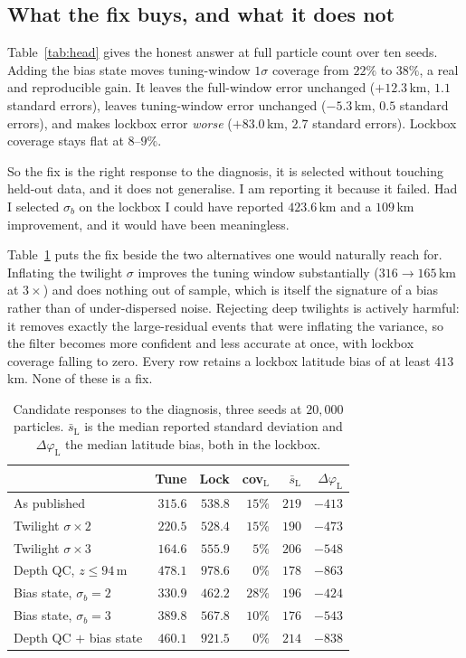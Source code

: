\documentclass[conference]{IEEEtran}
\begin{document}
\subsection{What the fix buys, and what it does not}
Table~\ref{tab:head} gives the honest answer at full particle count over ten
seeds. Adding the bias state moves tuning-window $1\sigma$ coverage from $22\%$
to $38\%$, a real and reproducible gain. It leaves the full-window error
unchanged ($+12.3$\,\si{\km}, $1.1$ standard errors), leaves tuning-window error
unchanged ($-5.3$\,\si{\km}, $0.5$ standard errors), and makes lockbox error
\emph{worse} ($+83.0$\,\si{\km}, $2.7$ standard errors). Lockbox coverage stays
flat at $8$--$9\%$.

So the fix is the right response to the diagnosis, it is selected without
touching held-out data, and it does not generalise. I am reporting it because it
failed. Had I selected $\sigma_b$ on the lockbox I could have reported
$423.6$\,\si{\km} and a $109$\,\si{\km} improvement, and it would have been
meaningless.

Table~\ref{tab:ladder} puts the fix beside the two alternatives one would
naturally reach for. Inflating the twilight $\sigma$ improves the tuning window
substantially ($316 \rightarrow 165$\,\si{\km} at $3\times$) and does nothing out
of sample, which is itself the signature of a bias rather than of
under-dispersed noise. Rejecting deep twilights is actively harmful: it removes
exactly the large-residual events that were inflating the variance, so the
filter becomes more confident and less accurate at once, with lockbox coverage
falling to zero. Every row retains a lockbox latitude bias of at least
$413$\,\si{\km}. None of these is a fix.

\begin{table}[t]
\caption{Candidate responses to the diagnosis, three seeds at $20{,}000$
particles. $\bar{s}_\text{L}$ is the median reported standard deviation and
$\Delta\varphi_\text{L}$ the median latitude bias, both in the lockbox.}
\label{tab:ladder}
\centering
\begin{tabular}{lrrrrr}
\toprule
 & Tune & Lock & cov$_\text{L}$ & $\bar{s}_\text{L}$ & $\Delta\varphi_\text{L}$ \\
\midrule
As published            & $315.6$ & $538.8$ & $15\%$ & $219$ & $-413$ \\
Twilight $\sigma\times2$ & $220.5$ & $528.4$ & $15\%$ & $190$ & $-473$ \\
Twilight $\sigma\times3$ & $164.6$ & $555.9$ & $5\%$  & $206$ & $-548$ \\
Depth QC, $z\le94$\,\si{\m} & $478.1$ & $978.6$ & $0\%$ & $178$ & $-863$ \\
Bias state, $\sigma_b=2$ & $330.9$ & $462.2$ & $28\%$ & $196$ & $-424$ \\
Bias state, $\sigma_b=3$ & $389.8$ & $567.8$ & $10\%$ & $176$ & $-543$ \\
Depth QC $+$ bias state  & $460.1$ & $921.5$ & $0\%$  & $214$ & $-838$ \\
\bottomrule
\end{tabular}
\end{table}
\end{document}
